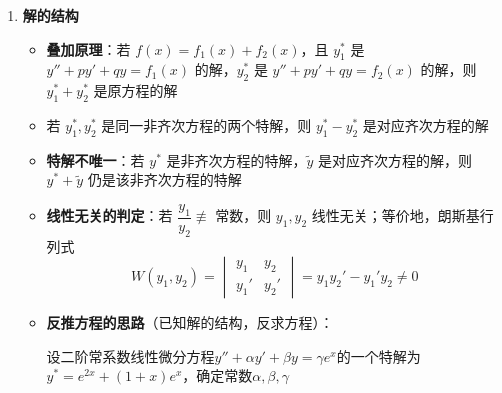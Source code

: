 \documentclass[../book.tex]{subfiles}
\begin{document}
\begin{enumerate}
\begin{itemize}
\begin{enumerate}
\begin{enumerate}
                    \[
                        y^* = e^{\alpha x}\dfrac{1}{F(D+\alpha)}v(x)
                    \]
                    将问题转化为 $\dfrac{1}{F(D+\alpha)}v(x)$，再用前述方法求解。
                \end{enumerate}
            \end{enumerate}

        \end{itemize}
        \item \textbf{解的结构}
        \begin{itemize}
            \item \textbf{叠加原理}：若 $f(x) = f_1(x) + f_2(x)$，且 $y_1^*$ 是 $y'' + py' + qy = f_1(x)$ 的解，$y_2^*$ 是 $y'' + py' + qy = f_2(x)$ 的解，则 $y_1^* + y_2^*$ 是原方程的解
            \item 若 $y_1^*, y_2^*$ 是同一非齐次方程的两个特解，则 $y_1^* - y_2^*$ 是对应齐次方程的解
            \item \textbf{特解不唯一}：若 $y^*$ 是非齐次方程的特解，$\tilde{y}$ 是对应齐次方程的解，则 $y^* + \tilde{y}$ 仍是该非齐次方程的特解
            \item \textbf{线性无关的判定}：若 $\dfrac{y_1}{y_2} \not\equiv$ 常数，则 $y_1, y_2$ 线性无关；等价地，朗斯基行列式
            \[
                W(y_1, y_2) = \begin{vmatrix}
                                  y_1 & y_2 \\ y_1' & y_2'
                \end{vmatrix} = y_1 y_2' - y_1' y_2 \neq 0
            \]
            \item \textbf{反推方程的思路}（已知解的结构，反求方程）：

            \begin{analysisbox}[Example]
                设二阶常系数线性微分方程$y'' + \alpha y' + \beta y = \gamma e^x$的一个特解为$y^* = e^{2x} + (1+x)e^x$，确定常数$\alpha, \beta, \gamma$


\end{analysisbox}
\end{itemize}
\end{enumerate}
\end{document}
